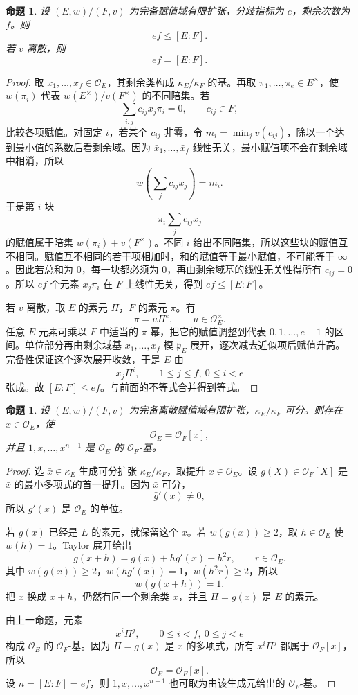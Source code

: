 \documentclass[11pt,a4paper,openany]{ctexbook}
\numberwithin{equation}{chapter}
\theoremstyle{plain}
\newtheorem{proposition}[theorem]{命题}
\theoremstyle{definition}
\theoremstyle{remark}
\begin{document}
\begin{proposition}
设 $(E,w)/(F,v)$ 为完备赋值域有限扩张，分歧指标为 $e$，剩余次数为 $f$。则
\[
ef\le [E:F].
\]
若 $v$ 离散，则
\[
ef=[E:F].
\]
\end{proposition}

\begin{proof}
取 $x_1,\dots,x_f\in\mathcal O_E$，其剩余类构成 $\kappa_E/\kappa_F$ 的基。再取 $\pi_1,\dots,\pi_e\in E^\times$，使 $w(\pi_i)$ 代表 $w(E^\times)/v(F^\times)$ 的不同陪集。若
\[
\sum_{i,j}c_{ij}x_j\pi_i=0,\qquad c_{ij}\in F,
\]
比较各项赋值。对固定 $i$，若某个 $c_{ij}$ 非零，令
$m_i=\min_j v(c_{ij})$，除以一个达到最小值的系数后看剩余域。因为
\(\bar x_1,\dots,\bar x_f\) 线性无关，最小赋值项不会在剩余域中相消，所以
\[
w\left(\sum_jc_{ij}x_j\right)=m_i.
\]
于是第 $i$ 块
\[
\pi_i\sum_jc_{ij}x_j
\]
的赋值属于陪集 $w(\pi_i)+v(F^\times)$。不同 $i$ 给出不同陪集，所以这些块的赋值互不相同。赋值互不相同的若干项相加时，和的赋值等于最小赋值，不可能等于
$\infty$。因此若总和为 $0$，每一块都必须为 $0$，再由剩余域基的线性无关性得所有
$c_{ij}=0$。所以 $ef$ 个元素 $x_j\pi_i$ 在 $F$ 上线性无关，得到
$ef\le [E:F]$。

若 $v$ 离散，取 $E$ 的素元 $\Pi$，$F$ 的素元 $\pi$。有
\[
\pi=u\Pi^e,\qquad u\in\mathcal O_E^\times.
\]
任意 $E$ 元素可乘以 $F$ 中适当的 $\pi$ 幂，把它的赋值调整到代表
$0,1,\dots,e-1$ 的区间。单位部分再由剩余域基 $x_1,\dots,x_f$ 模
\(\mathfrak p_E\) 展开，逐次减去近似项后赋值升高。完备性保证这个逐次展开收敛，于是
$E$ 由
\[
x_j\Pi^i,\qquad 1\le j\le f,\ 0\le i<e
\]
张成。故 $[E:F]\le ef$。与前面的不等式合并得到等式。
\end{proof}

\begin{proposition}
设 $(E,w)/(F,v)$ 为完备离散赋值域有限扩张，$\kappa_E/\kappa_F$ 可分。则存在 $x\in\mathcal O_E$，使
\[
\mathcal O_E=\mathcal O_F[x],
\]
并且 $1,x,\dots,x^{n-1}$ 是 $\mathcal O_E$ 的 $\mathcal O_F$-基。
\end{proposition}

\begin{proof}
选 $\bar x\in\kappa_E$ 生成可分扩张 $\kappa_E/\kappa_F$，取提升
$x\in\mathcal O_E$。设 $g(X)\in\mathcal O_F[X]$ 是 $\bar x$ 的最小多项式的首一提升。因为
\(\bar x\) 可分，
\[
\bar g'(\bar x)\ne0,
\]
所以 $g'(x)$ 是 $\mathcal O_E$ 的单位。

若 $g(x)$ 已经是 $E$ 的素元，就保留这个 $x$。若 $w(g(x))\ge2$，取
$h\in\mathcal O_E$ 使 $w(h)=1$。Taylor 展开给出
\[
g(x+h)=g(x)+hg'(x)+h^2r,\qquad r\in\mathcal O_E.
\]
其中 $w(g(x))\ge2$，$w(hg'(x))=1$，$w(h^2r)\ge2$，所以
\[
w(g(x+h))=1.
\]
把 $x$ 换成 $x+h$，仍然有同一个剩余类 $\bar x$，并且 $\Pi=g(x)$ 是
$E$ 的素元。

由上一命题，元素
\[
x^i\Pi^j,\qquad 0\le i<f,\ 0\le j<e
\]
构成 $\mathcal O_E$ 的 $\mathcal O_F$-基。因为 $\Pi=g(x)$ 是 $x$ 的多项式，所有
$x^i\Pi^j$ 都属于 $\mathcal O_F[x]$，所以
\[
\mathcal O_E=\mathcal O_F[x].
\]
设 $n=[E:F]=ef$，则 $1,x,\dots,x^{n-1}$ 也可取为由该生成元给出的
\(\mathcal O_F\)-基。
\end{proof}
\end{document}
